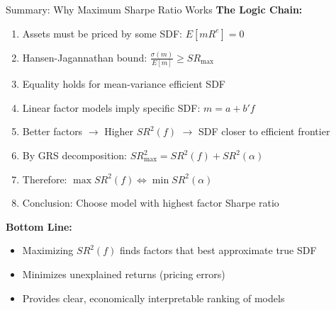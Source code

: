 \documentclass{beamer}
\begin{document}
\begin{frame}{Summary: Why Maximum Sharpe Ratio Works}
    \textbf{The Logic Chain:}
    
    
    \begin{enumerate}
        \item Assets must be priced by some SDF: $E[m R^e] = 0$
        
        \item Hansen-Jagannathan bound: $\frac{\sigma(m)}{E[m]} \geq SR_{\max}$
        
        \item Equality holds for mean-variance efficient SDF
        
        \item Linear factor models imply specific SDF: $m = a + b' f$
        
        \item Better factors $\rightarrow$ Higher $SR^2(f)$ $\rightarrow$ SDF closer to efficient frontier
        
        \item By GRS decomposition: $SR^2_{\max} = SR^2(f) + SR^2(\alpha)$
        
        \item Therefore: $\max SR^2(f) \Leftrightarrow \min SR^2(\alpha)$
        
        \item Conclusion: Choose model with highest factor Sharpe ratio
    \end{enumerate}
    
    \vspace{0.3cm}
    \textbf{Bottom Line:}
    \begin{itemize}
        \item Maximizing $SR^2(f)$ finds factors that best approximate true SDF
        \item Minimizes unexplained returns (pricing errors)
        \item Provides clear, economically interpretable ranking of models
    \end{itemize}
\end{frame}
\end{document}
